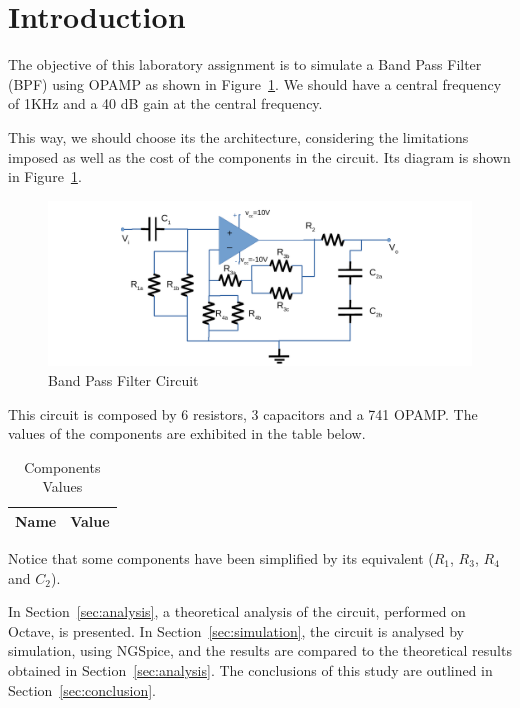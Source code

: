 \section{Introduction}
\label{sec:introduction}
The objective of this laboratory assignment is to simulate a Band Pass Filter (BPF) using OPAMP as shown in Figure~\ref{fig:circuit}.
We should have a central frequency of 1KHz and a 40 dB gain at the central frequency. 

This way, we should choose its the architecture, considering the limitations imposed as well as the cost of the components in the circuit.
Its diagram is shown in Figure~\ref{fig:circuit}.
\begin{figure}[H] \centering
\includegraphics[width=0.8\linewidth]{circuit.pdf}
\caption{Band Pass Filter Circuit}                                     
\label{fig:circuit}
\end{figure}
This circuit is composed by 6 resistors, 3 capacitors and a 741 OPAMP.
The values of the components are exhibited in the table below.
\begin{table}[H]
  \centering
  \begin{tabular}{|l|r|}
     \hline    
    {\bf Name} & {\bf Value} \\ \hline   
    
  \end{tabular}
  \caption{Components Values}
  \label{tab:datags}
\end{table}
Notice that some components have been simplified by its equivalent ($R_1$, $R_3$, $R_4$ and $C_2$).

In Section~\ref{sec:analysis}, a theoretical analysis of the circuit, 
performed on Octave, is presented. In Section~\ref{sec:simulation}, the 
circuit is analysed by simulation, using NGSpice, and the results are compared to 
the theoretical results obtained in Section~\ref{sec:analysis}. The conclusions 
of this study are outlined in Section~\ref{sec:conclusion}.

